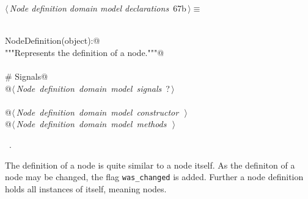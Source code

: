 \documentclass[
    a4paper,      %
    10pt,         %
    openright,    %
    notitlepage,  %
    parskip=half, %
]{scrreprt}       %
\theoremstyle{definition}                    %
\begin{document}
\begin{flushleft} \small
\begin{minipage}{\linewidth}\label{scrap111}\raggedright\small
{} $\langle\,${\itshape Node definition domain model declarations}\nobreak\ {\footnotesize {67b}}$\,\rangle\equiv$
\vspace{-1exm}
\begin{list}{}{} \item
\mbox{}\lstinline@@\\
\mbox{}\lstinline@class NodeDefinition(object):@\\
\mbox{}\lstinline@    """Represents the definition of a node."""@\\
\mbox{}\lstinline@@\\
\mbox{}\lstinline@    # Signals@\\
\mbox{}\lstinline@    @\hbox{$\langle\,${\itshape Node definition domain model signals}\nobreak\ {\footnotesize ?}$\,\rangle$}\lstinline@@\\
\mbox{}\lstinline@@\\
\mbox{}\lstinline@    @\hbox{$\langle\,${\itshape Node definition domain model constructor}\nobreak\ {\footnotesize {}}$\,\rangle$}\lstinline@@\\
\mbox{}\lstinline@    @\hbox{$\langle\,${\itshape Node definition domain model methods}\nobreak\ {\footnotesize {}}$\,\rangle$}\lstinline@@{\NWsep}
\end{list}
\vspace{-1.5ex}
\footnotesize
\begin{list}{}{\setlength{\itemsep}{-\parsep}\setlength{\itemindent}{-\leftmargin}}
\item \NWtxtMacroRefIn\ .

\item{}
\end{list}
\end{minipage}\vspace{4ex}
\end{flushleft}
The definition of a node is quite similar to a node itself. As the definiton of
a node may be changed, the flag \verb+was_changed+ is added. Further a node
definition holds all instances of itself, meaning nodes.
\end{document}
